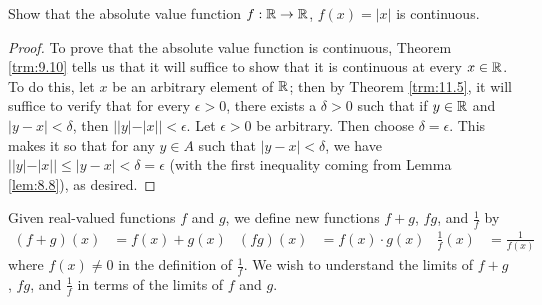 \documentclass[../main.tex]{subfiles}
\begin{document}
\begin{exercise}\label{exr:11.7}
    Show that the absolute value function $f:\mathbb{R}\to\mathbb{R}$, $f(x)=|x|$ is continuous.
    \begin{proof}
        To prove that the absolute value function is continuous, Theorem \ref{trm:9.10} tells us that it will suffice to show that it is continuous at every $x\in\mathbb{R}$. To do this, let $x$ be an arbitrary element of $\mathbb{R}$; then by Theorem \ref{trm:11.5}, it will suffice to verify that for every $\epsilon>0$, there exists a $\delta>0$ such that if $y\in\mathbb{R}$ and $|y-x|<\delta$, then $||y|-|x||<\epsilon$. Let $\epsilon>0$ be arbitrary. Then choose $\delta=\epsilon$. This makes it so that for any $y\in A$ such that $|y-x|<\delta$, we have $||y|-|x||\leq|y-x|<\delta=\epsilon$ (with the first inequality coming from Lemma \ref{lem:8.8}), as desired.
    \end{proof}
\end{exercise}

Given real-valued functions $f$ and $g$, we define new functions $f+g$, $fg$, and $\frac{1}{f}$ by
\begin{align*}
    (f+g)(x) &= f(x)+g(x)&
    (fg)(x) &= f(x)\cdot g(x)&
    \frac{1}{f}(x) &= \frac{1}{f(x)}
\end{align*}
where $f(x)\neq 0$ in the definition of $\frac{1}{f}$. We wish to understand the limits of $f+g$, $fg$, and $\frac{1}{f}$ in terms of the limits of $f$ and $g$.
\end{document}
